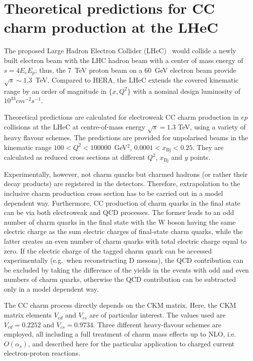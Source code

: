 \documentclass[pdftex,twocolumn,epjc3]{svjour3}          %
\newcommand{\xbj}{\ensuremath{x_{\text{Bj}}}\xspace}
\begin{document}
\section{Theoretical predictions for CC charm production at the LHeC} \label{sec:thpred}


The proposed Large Hadron Electron Collider (LHeC)~\cite{AbelleiraFernandez:2012cc} would collide a newly built electron beam
with the LHC hadron beam with a center of mass energy of  $s = 4 E_e E_p$;
thus, the 7~TeV proton beam on a 60~GeV electron beam  provide $\sqrt{s}\sim 1.3$~TeV.
%
Compared to  HERA, the LHeC extends the covered kinematic range by an order of magnitude in $\{x,Q^2 \}$
with a nominal design luminosity of $10^{33} cm^{-2} s^{-1}$.


Theoretical predictions are calculated for electroweak CC charm
production in $ep$ collisions at the LHeC at centre-of-mass energy
$\sqrt{s} = 1.3$ TeV, using a variety of heavy flavour schemes. The
predictions are provided for unpolarised beams in the kinematic range
$100 < Q^2 < 100000$~GeV$^2$, $0.0001 < \xbj < 0.25$. They are
calculated as reduced cross sections at different $Q^2$, \xbj and $y$
points.


Experimentally, however, not charm quarks but charmed
hadrons (or rather their decay products) are registered in the
detectors.  Therefore, extrapolation to the inclusive charm
production cross section has to be carried out in a model dependent
way.  Furthermore, CC production of charm quarks in the final state
can be via both electroweak and QCD processes.  The former leads to
an odd number of charm quarks in the final state with the W boson
having the same electric charge as the sum electric charges of
final-state charm quarks, while the latter creates an even number of
charm quarks with total electric charge equal to zero.  If the
electric charge of the tagged charm quark can be accessed
experimentally (e.g.~when reconstructing D mesons), the QCD
contribution can be excluded by taking the difference of the yields
in the events with odd and even numbers of charm quarks, otherwise
the QCD contribution can be subtracted only in a model dependent
way.  

The CC charm process directly depends on the CKM matrix. Here, the CKM matrix 
elements $V_{cd}$ and $V_{cs}$ are of particular interest. The values used are 
$V_{cd} = 0.2252$ and $V_{cs} = 0.9734$.
Three different heavy-flavour schemes are employed, all including a full 
treatment of charm mass effects up to NLO,
i.e.~$O(\alpha_s)$, and described here for the particular application 
to charged current electron-proton reactions.
\end{document}
